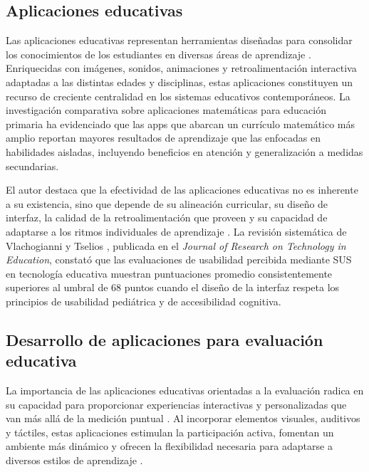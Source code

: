 \subsection{Aplicaciones educativas}

Las aplicaciones educativas representan herramientas diseñadas para consolidar los conocimientos de los estudiantes en diversas áreas de aprendizaje \cite{sayed2023adaptive,debrenti2024gbl}. Enriquecidas con imágenes, sonidos, animaciones y retroalimentación interactiva adaptadas a las distintas edades y disciplinas, estas aplicaciones constituyen un recurso de creciente centralidad en los sistemas educativos contemporáneos. La investigación comparativa sobre aplicaciones matemáticas para educación primaria \cite{outhwaite2022apps} ha evidenciado que las apps que abarcan un currículo matemático más amplio reportan mayores resultados de aprendizaje que las enfocadas en habilidades aisladas, incluyendo beneficios en atención y generalización a medidas secundarias.

El autor destaca que la efectividad de las aplicaciones educativas no es inherente a su existencia, sino que depende de su alineación curricular, su diseño de interfaz, la calidad de la retroalimentación que proveen y su capacidad de adaptarse a los ritmos individuales de aprendizaje \cite{sayed2023adaptive,vlachogianni2022sus}. La revisión sistemática de Vlachogianni y Tselios \cite{vlachogianni2022sus}, publicada en el \textit{Journal of Research on Technology in Education}, constató que las evaluaciones de usabilidad percibida mediante SUS en tecnología educativa muestran puntuaciones promedio consistentemente superiores al umbral de 68 puntos cuando el diseño de la interfaz respeta los principios de usabilidad pediátrica y de accesibilidad cognitiva.

\subsection{Desarrollo de aplicaciones para evaluación educativa}

La importancia de las aplicaciones educativas orientadas a la evaluación radica en su capacidad para proporcionar experiencias interactivas y personalizadas que van más allá de la medición puntual \cite{gonzalez2021ai,maksimchuk2025genai}. Al incorporar elementos visuales, auditivos y táctiles, estas aplicaciones estimulan la participación activa, fomentan un ambiente más dinámico y ofrecen la flexibilidad necesaria para adaptarse a diversos estilos de aprendizaje \cite{sayed2023adaptive}.

